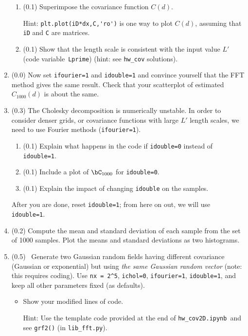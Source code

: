 \documentclass[11pt,titlepage,fleqn]{article}
\newcommand{\tfile}{{\tt hw\_cov2D.ipynb}}
\begin{document}
\begin{enumerate}
\begin{enumerate}
\item (0.1) Superimpose the covariance function $C(d)$.

Hint: \verb+plt.plot(iD*dx,C,'ro')+ is one way to plot $C(d)$, assuming that \verb+iD+ and \verb+C+ are matrices.

\item (0.1) Show that the length scale is consistent with the input value $L'$ (code variable~\verb+Lprime+) (hint: see \verb+hw_cov+ solutions).
\end{enumerate}

\item (0.0) Now set \verb+ifourier=1+ and \verb+idouble=1+ and convince yourself that the FFT method gives the same result. Check that your scatterplot of estimated $C_{1000}(d)$ is about the same.

\item (0.3) The Cholesky decomposition is numerically unstable. In order to consider denser grids, or covariance functions with large $L'$ length scales, we need to use Fourier methods (\verb+ifourier=1+).

\begin{enumerate}
\item (0.1) Explain what happens in the code if \verb+idouble=0+ instead of \verb+idouble=1+.
\item (0.1) Include a plot of $\bC_{1000}$ for \verb+idouble=0+.
\item (0.1) Explain the impact of changing \verb+idouble+ on the samples.
\end{enumerate}
%
After you are done, reset \verb+idouble=1+; from here on out, we will use \verb+idouble=1+.

\item (0.2) Compute the mean and standard deviation of each sample from the set of 1000 samples. Plot the means and standard deviations as two histograms.

\item (0.5) \ptag\ Generate two Gaussian random fields having different covariance (Gaussian or exponential) but using {\em the same Gaussian random vector} (note: this requires coding). Use \verb+nx = 2^5+, \verb+ichol=0+, \verb+ifourier=1+, \verb+idouble=1+, and keep all other parameters fixed (as defaults).

\begin{itemize}
\item Show your modified lines of code.

Hint: Use the template code provided at the end of \tfile\ and see \verb+grf2()+ (in \verb+lib_fft.py+).


\end{itemize}
\end{enumerate}
\end{document}
